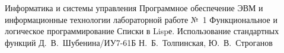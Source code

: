 \documentclass{bmstu}
\begin{document}
	\makereporttitle
	{Информатика и системы управления} %
	{Программное обеспечение ЭВМ и информационные технологии} %
	{лабораторной работе №~1} %
	{Функциональное и логическое программирование} %
	{Списки в Lispе. Использование стандартных функций} %
	{} %
	{Д.~В.~Шубенина/ИУ7-61Б} %
	{Н.~Б.~Толпинская, Ю.~В.~Строганов} %
	
	
	
\end{document}
